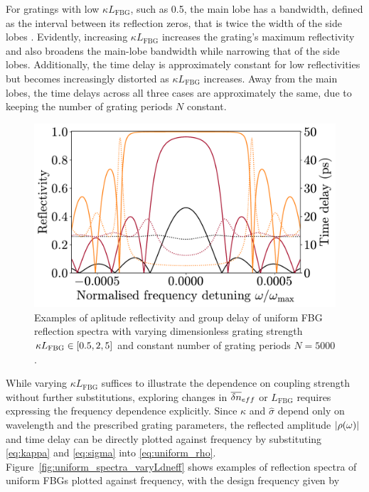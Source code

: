 For gratings with low $\kappa L_\text{FBG}$, such as 0.5, the main lobe has a bandwidth, defined as the interval between its reflection zeros, that is twice the width of the side lobes \cite{erdogan1997fiber}.
Evidently, increasing $\kappa L_\text{FBG}$ increases the grating's maximum reflectivity and also broadens the main-lobe bandwidth while narrowing that of the side lobes.
Additionally, the time delay is approximately constant for low reflectivities but becomes increasingly distorted as $\kappa L_\text{FBG}$ increases.
Away from the main lobes, the time delays across all three cases are approximately the same, due to keeping the number of grating periods $N$ constant.
%
\begin{figure}[!t]
    \includegraphics[width=\linewidth]{Images/Uniform_varying_kL_Rtau.pdf}
    \caption{Examples of aplitude reflectivity and group delay of uniform FBG reflection spectra with varying dimensionless grating strength $\kappa L_\text{FBG} \in [0.5, 2, 5]$ and constant number of grating periods $N=5000$.}
    \label{fig:uniform_spectra_varykL}
\end{figure}
%
\par
%
While varying $\kappa L_\text{FBG}$ suffices to illustrate the dependence on coupling strength without further substitutions, exploring changes in $\overline{\delta n}_{eff}$ or $L_\text{FBG}$ requires expressing the frequency dependence explicitly.
Since $\kappa$ and $\hat{\sigma}$ depend only on wavelength and the prescribed grating parameters, the reflected amplitude $|\rho(\omega)|$ and time delay can be directly plotted against frequency by substituting \eqref{eq:kappa} and \eqref{eq:sigma} into \eqref{eq:uniform_rho}.
Figure~\ref{fig:uniform_spectra_varyLdneff} shows examples of reflection spectra of uniform FBGs plotted against frequency, with the design frequency given by

